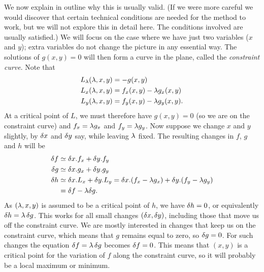 \documentclass[reqno]{amsart}
\theoremstyle{definition}
\begin{document}
We now explain in outline why this is usually valid.  (If we were more
careful we would discover that certain technical conditions are needed
for the method to work, but we will not explore this in detail here.
The conditions involved are usually satisfied.)  We will focus on the
case where we have just two variables ($x$ and $y$); extra variables
do not change the picture in any essential way.  The solutions of
$g(x,y)=0$ will then form a curve in the plane, called the
\emph{constraint curve}.  Note that
\begin{align*}
 L_\lambda(\lambda,x,y) &= -g(x,y) \\
 L_x(\lambda,x,y) &= f_x(x,y)-\lambda g_x(x,y) \\
 L_y(\lambda,x,y) &= f_y(x,y)-\lambda g_y(x,y).
\end{align*}
At a critical point of $L$, we must therefore have $g(x,y)=0$ (so we
are on the constraint curve) and $f_x=\lambda g_x$ and $f_y=\lambda g_y$.  Now
suppose we change $x$ and $y$ slightly, by $\delta x$ and $\delta y$ say,
while leaving $\lambda$ fixed.  The resulting changes in $f$, $g$ and $h$
will be
\begin{align*}
 \delta f & \simeq \delta x.f_x + \delta y.f_y \\
 \delta g & \simeq \delta x.g_x + \delta y.g_y \\
 \delta h & \simeq \delta x.L_x + \delta y.L_y 
         = \delta x.(f_x-\lambda g_x) + \delta y.(f_y-\lambda g_y) \\
       &= \delta f - \lambda \delta g.
\end{align*}
As $(\lambda,x,y)$ is assumed to be a critical point of $h$, we have
$\delta h=0$, or equivalently $\delta h=\lambda\,\delta g$.  This works for all
small changes $(\delta x,\delta y)$, including those that move us off the
constraint curve.  We are mostly interested in changes that keep us on
the constraint curve, which means that $g$ remains equal to zero, so
$\delta g=0$.  For such changes the equation $\delta f=\lambda\,\delta g$ becomes
$\delta f=0$.  This means that $(x,y)$ is a critical point for the
variation of $f$ along the constraint curve, so it will probably be a
local maximum or minimum.
\end{document}
